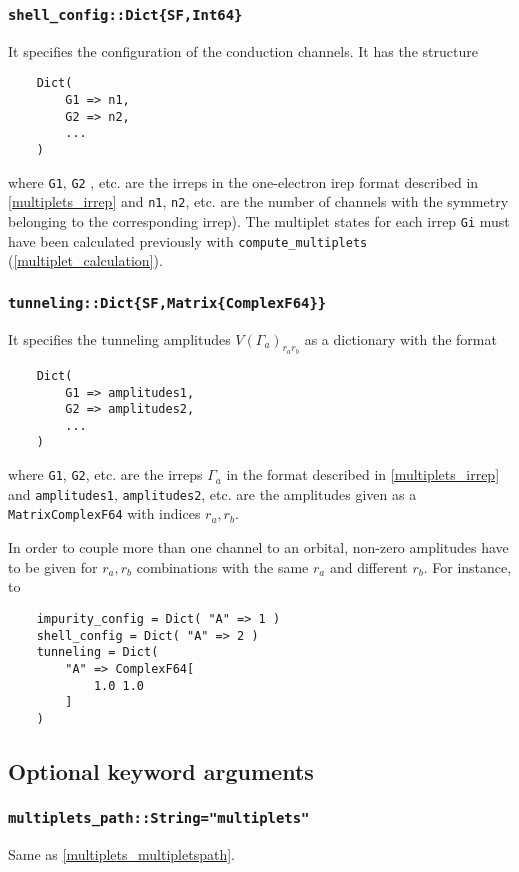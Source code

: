 \documentclass[notitlepage]{article}
\begin{document}
\subsubsection{\texttt{shell\_config::Dict\{SF,Int64\}}}
\label{nrg_shellconfig}
It specifies the configuration of the conduction channels.
It has the structure
\begin{verbatim}
    Dict( 
        G1 => n1,
        G2 => n2,
        ...
    )
\end{verbatim}
where \texttt{G1}, \texttt{G2} , etc. are the irreps in the
one-electron irep format described in \ref{multiplets_irrep}
and \texttt{n1}, \texttt{n2}, etc. are the number of
channels with the symmetry belonging to the corresponding
irrep). The multiplet states for each irrep \texttt{Gi} must
have been calculated previously with
\texttt{compute\_multiplets} (\ref{multiplet_calculation}).

\subsubsection{\texttt{tunneling::Dict\{SF,Matrix\{ComplexF64\}\}}}
\label{nrg_tunnneling}
It specifies the tunneling amplitudes $V(\Gamma_a)_{r_a
r_b}$ as a dictionary with the format
\begin{verbatim}
    Dict(
        G1 => amplitudes1,
        G2 => amplitudes2,
        ...
    )
\end{verbatim}
where \texttt{G1}, \texttt{G2}, etc. are the irreps
$\Gamma_a$ in the format described in \ref{multiplets_irrep}
and \texttt{amplitudes1}, \texttt{amplitudes2}, etc. are the
amplitudes given as a \texttt{Matrix{ComplexF64}} with
indices $r_a,r_b$.
\par
In order to couple more than one channel to an orbital,
non-zero amplitudes have to be given for $r_a,r_b$
combinations with the same $r_a$ and different $r_b$. For
instance, to 
\begin{verbatim}
    impurity_config = Dict( "A" => 1 )
    shell_config = Dict( "A" => 2 )
    tunneling = Dict(
        "A" => ComplexF64[
            1.0 1.0
        ]
    )
\end{verbatim}


\subsection{Optional keyword arguments}

\subsubsection{\texttt{multiplets\_path::String="multiplets"}}
\label{nrg_multipletspath}
Same as \ref{multiplets_multipletspath}.
\end{document}
